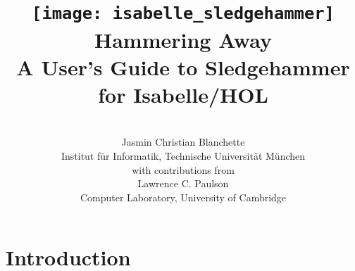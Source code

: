\documentclass[a4paper,12pt]{article}
\begin{document}
\renewcommand\labelitemi{\raise.065ex\hbox{\small\textbullet}}

\title{\texttt{[image: isabelle\_sledgehammer]} \\[4ex]
Hammering Away \\[\smallskipamount]
\Large A User's Guide to Sledgehammer for Isabelle/HOL}
\author{\hbox{} \\
Jasmin Christian Blanchette \\
{\normalsize Institut f\"ur Informatik, Technische Universit\"at M\"unchen} \\[4\smallskipamount]
{\normalsize with contributions from} \\[4\smallskipamount]
Lawrence C. Paulson \\
{\normalsize Computer Laboratory, University of Cambridge} \\
\hbox{}}

\maketitle

\tableofcontents

\setlength{\parskip}{.7em plus .2em minus .1em}
\setlength{\parindent}{0pt}
\setlength{\abovedisplayskip}{\parskip}
\setlength{\abovedisplayshortskip}{.9\parskip}
\setlength{\belowdisplayskip}{\parskip}
\setlength{\belowdisplayshortskip}{.9\parskip}

\newenvironment{enum}%
    {\begin{list}{}{%
        \setlength{\topsep}{.1\parskip}%
        \setlength{\partopsep}{.1\parskip}%
        \setlength{\itemsep}{\parskip}%
        \advance\itemsep by-\parsep}}
    {\end{list}}

\def\pre{\begingroup\vskip0pt plus1ex\advance\leftskip by\leftmargin
\advance\rightskip by\leftmargin}
\def\post{\vskip0pt plus1ex\endgroup}

\def\prew{\pre\advance\rightskip by-\leftmargin}
\def\postw{\post}

\section{Introduction}
\label{introduction}
\end{document}
